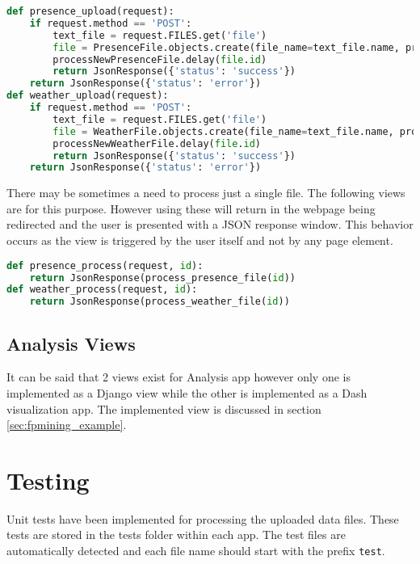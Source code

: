 \begin{lstlisting}[language={Python}]
def presence_upload(request):
    if request.method == 'POST':
        text_file = request.FILES.get('file')
        file = PresenceFile.objects.create(file_name=text_file.name, processing_status=False, upload=text_file)
        processNewPresenceFile.delay(file.id)
        return JsonResponse({'status': 'success'})
    return JsonResponse({'status': 'error'})
def weather_upload(request):
    if request.method == 'POST':
        text_file = request.FILES.get('file')
        file = WeatherFile.objects.create(file_name=text_file.name, processing_status=False, upload=text_file)
        processNewWeatherFile.delay(file.id)
        return JsonResponse({'status': 'success'})
    return JsonResponse({'status': 'error'})

\end{lstlisting}

There may be sometimes a need to process just a single file. The following views are for this purpose. However using these will
return in the webpage being redirected and the user is presented with a JSON response window. This behavior occurs as the view is 
triggered by the user itself and not by any page element.

\begin{lstlisting}[language={Python}]
def presence_process(request, id):
    return JsonResponse(process_presence_file(id))
def weather_process(request, id):
    return JsonResponse(process_weather_file(id))
\end{lstlisting}

\subsection{Analysis Views}

It can be said that 2 views exist for Analysis app however only one is implemented as a Django view while the other is
implemented as a Dash visualization app. The implemented view is discussed in section \ref{sec:fpmining_example}.

\section{Testing}
\label{sec:testing}

Unit tests have been implemented for processing the uploaded data files. These tests are stored in the tests folder within each app.
The test files are automatically detected and each file name should start with the prefix \texttt{test}.

